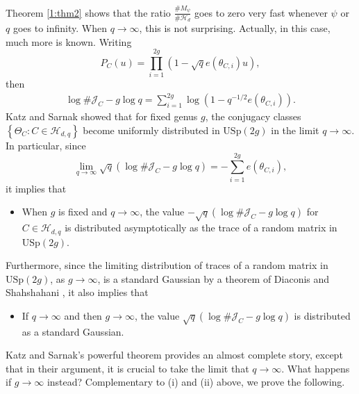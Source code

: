 \documentclass[12pt]{amsart}
\theoremstyle{plain}
\newcommand{\J}{\mathcal J}
\newcommand{\HH}{{\mathcal H}}
\begin{document}
Theorem \ref{1:thm2} shows that the ratio $\frac{\#M_{\psi}}{\# \HH_d}$ goes to zero very fast whenever $\psi$ or $q$ goes to infinity. When $q \to \infty$, this is not surprising. Actually, in this case, much more is known. Writing \[P_C(u)=\prod_{i=1}^{2g}\left(1-\sqrt{q} e\left(\theta_{C,i}\right)u\right),\]
then
\begin{eqnarray*} \log \#\J_{C}-g \log q=\sum_{i=1}^{2g} \log \left(1-q^{-1/2}e(\theta_{C,i})\right). \end{eqnarray*}
Katz and Sarnak \cite{kat} showed that for fixed genus $g$, the conjugacy classes $\left\{\Theta_{C}: C\in \HH_{d,q}\right\}$ become uniformly distributed in $\mathrm{USp}(2g)$ in the limit $q \to \infty$. In particular, since
\[\lim_{q \to \infty}\sqrt{q}\left(\log \#\J_{C}-g \log q\right)=-\sum_{i=1}^{2g} e(\theta_{C,i}),\]
it implies that
\begin{itemize}
\item[(i).] When $g$ is fixed and $q \to \infty$, the value $-\sqrt{q}\left(\log \#\J_{C}-g \log q\right)$ for $C \in \HH_{d,q}$ is distributed asymptotically as the trace of a random matrix in $\mathrm{USp}(2g)$.
\end{itemize}
Furthermore, since the limiting distribution of traces of a random matrix in $\mathrm{USp}(2g)$, as $g \to \infty$, is a standard Gaussian by a theorem of Diaconis and Shahshahani \cite{dia}, it also implies that
\begin{itemize}
\item[(ii).] If $q \to \infty$ and then $g \to \infty$, the value $\sqrt{q}\left(\log \#\J_{C}-g \log q\right)$ is distributed as a standard Gaussian.
\end{itemize}
Katz and Sarnak's powerful theorem \cite{kat} provides an almost complete story, except that in their argument, it is crucial to take the limit that $q \to \infty$. What happens if $g \to \infty$ instead? Complementary to (i) and (ii) above, we prove the following.
\end{document}
